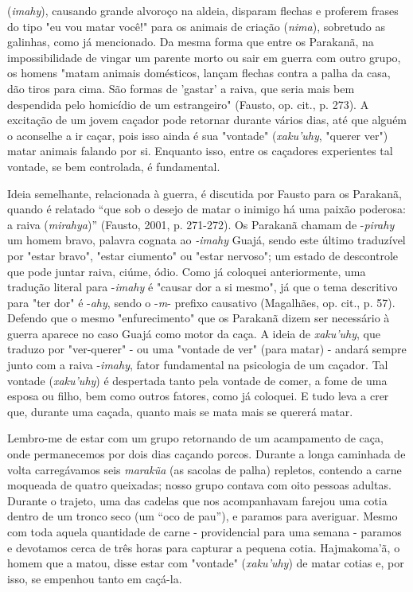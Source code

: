 (\emph{imahy}), causando grande alvoroço na aldeia, disparam flechas e
proferem frases do tipo "eu vou matar você!" para os animais de criação
(\emph{nima}), sobretudo as galinhas, como já mencionado. Da mesma forma
que entre os Parakanã, na impossibilidade de vingar um parente morto ou
sair em guerra com outro grupo, os homens "matam animais domésticos,
lançam flechas contra a palha da casa, dão tiros para cima. São formas
de 'gastar' a raiva, que seria mais bem despendida pelo homicídio de um
estrangeiro" (Fausto, op. cit., p. 273). A excitação de um jovem caçador
pode retornar durante vários dias, até que alguém o aconselhe a ir
caçar, pois isso ainda é sua "vontade" (\emph{xaku'uhy}, "querer ver")
matar animais falando por si. Enquanto isso, entre os caçadores
experientes tal vontade, se bem controlada, é fundamental.

Ideia semelhante, relacionada à guerra, é discutida por Fausto para os
Parakanã, quando é relatado ``que sob o desejo de matar o inimigo há uma
paixão poderosa: a raiva (\emph{mirahya})'' (Fausto, 2001, p. 271-272).
Os Parakanã chamam de -\emph{pirahy} um homem bravo, palavra cognata ao
\emph{-imahy} Guajá, sendo este último traduzível por "estar bravo",
"estar ciumento" ou "estar nervoso"; um estado de descontrole que pode
juntar raiva, ciúme, ódio. Como já coloquei anteriormente, uma tradução
literal para -\emph{imahy} é "causar dor a si mesmo", já que o tema
descritivo para "ter dor" é -\emph{ahy}, sendo o -\emph{m}- prefixo
causativo (Magalhães, op. cit., p. 57). Defendo que o mesmo
"enfurecimento" que os Parakanã dizem ser necessário à guerra aparece no
caso Guajá como motor da caça. A ideia de \emph{xaku'uhy}, que traduzo
por "ver-querer" - ou uma "vontade de ver" (para matar) - andará sempre
junto com a raiva -\emph{imahy}, fator fundamental na psicologia de um
caçador. Tal vontade (\emph{xaku'uhy}) é despertada tanto pela vontade
de comer, a fome de uma esposa ou filho, bem como outros fatores, como
já coloquei. E tudo leva a crer que, durante uma caçada, quanto mais se
mata mais se quererá matar.

Lembro-me de estar com um grupo retornando de um acampamento de caça,
onde permanecemos por dois dias caçando porcos. Durante a longa
caminhada de volta carregávamos seis \emph{marakũa} (as sacolas de
palha) repletos, contendo a carne moqueada de quatro queixadas; nosso
grupo contava com oito pessoas adultas. Durante o trajeto, uma das
cadelas que nos acompanhavam farejou uma cotia dentro de um tronco seco
(um ``oco de pau''), e paramos para averiguar. Mesmo com toda aquela
quantidade de carne - providencial para uma semana - paramos e devotamos
cerca de três horas para capturar a pequena cotia. Hajmakoma'ã, o homem
que a matou, disse estar com "vontade" (\emph{xaku'uhy}) de matar cotias
e, por isso, se empenhou tanto em caçá-la.

